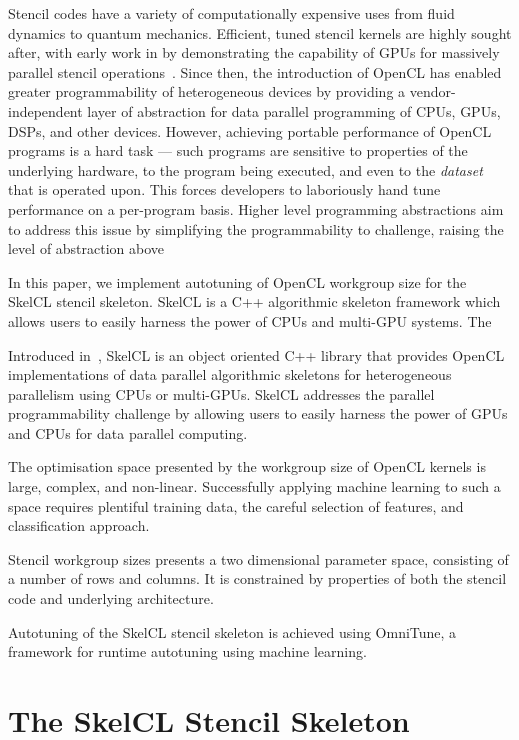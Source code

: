 \documentclass[nonatbib,preprint,10pt]{sigplanconf}
\begin{document}
Stencil codes have a variety of computationally expensive uses from
fluid dynamics to quantum mechanics. Efficient, tuned stencil kernels
are highly sought after, with early work in \citeyear{Bolz2003} by
\citeauthor{Bolz2003} demonstrating the capability of GPUs for
massively parallel stencil operations~\cite{Bolz2003}. Since then, the
introduction of OpenCL has enabled greater programmability of
heterogeneous devices by providing a vendor-independent layer of
abstraction for data parallel programming of CPUs, GPUs, DSPs, and
other devices. However, achieving portable performance of OpenCL
programs is a hard task --- such programs are sensitive to properties
of the underlying hardware, to the program being executed, and even to
the \emph{dataset} that is operated upon. This forces developers to
laboriously hand tune performance on a per-program basis. Higher level
programming abstractions aim to address this issue by simplifying the
programmability to challenge, raising the level of abstraction above

In this paper, we implement autotuning of OpenCL workgroup size for
the SkelCL stencil skeleton. SkelCL is a C++ algorithmic skeleton
framework which allows users to easily harness the power of CPUs and
multi-GPU systems. The

Introduced in~\cite{Steuwer2011}, SkelCL is an object oriented C++
library that provides OpenCL implementations of data parallel
algorithmic skeletons for heterogeneous parallelism using CPUs or
multi-GPUs. SkelCL addresses the parallel programmability challenge by
allowing users to easily harness the power of GPUs and CPUs for data
parallel computing.

The optimisation space presented by the workgroup size of OpenCL
kernels is large, complex, and non-linear. Successfully applying
machine learning to such a space requires plentiful training data, the
careful selection of features, and classification approach.

Stencil workgroup sizes presents a two dimensional parameter space,
consisting of a number of rows and columns. It is constrained by
properties of both the stencil code and underlying architecture.

Autotuning of the SkelCL stencil skeleton is achieved using OmniTune,
a framework for runtime autotuning using machine learning.

\section{The SkelCL Stencil Skeleton}
\end{document}

